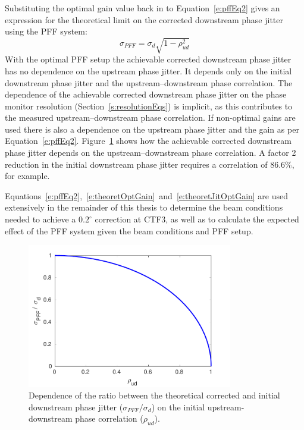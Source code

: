 Substituting the optimal gain value back in to Equation~\ref{e:pffEq2} gives an expression for the theoretical limit on the corrected downstream phase jitter using the PFF system:
\begin{equation}
\sigma_{PFF} = \sigma_d\sqrt{1-\rho_{ud}^2}
\label{e:theoretJitOptGain}
\end{equation}
With the optimal PFF setup the achievable corrected downstream phase jitter has no dependence on the upstream phase jitter. It depends only on the initial downstream phase jitter and the upstream--downstream phase correlation. The dependence of the achievable corrected downstream phase jitter on the phase monitor resolution (Section~\ref{s:resolutionEqs}) is implicit, as this contributes to the measured upstream--downstream phase correlation. If non-optimal gains are used there is also a dependence on the upstream phase jitter and the gain as per Equation~\ref{e:pffEq2}. Figure~\ref{f:theoretJitvsCorr} shows how the achievable corrected downstream phase jitter depends on the upstream--downstream phase correlation. A factor 2 reduction in the initial downstream phase jitter requires a correlation of 86.6\%, for example.

Equations~\ref{e:pffEq2},~\ref{e:theoretOptGain}~and~\ref{e:theoretJitOptGain} are used extensively in the remainder of this thesis to determine the beam conditions needed to achieve a \(0.2^\circ\) correction at CTF3, as well as to calculate the expected effect of the PFF system given the beam conditions and PFF setup.

\begin{figure}
  \centering
  \includegraphics[width=0.8\textwidth]{Figures/propagation/theoretJitvsCorr}
  \caption{Dependence of the ratio between the theoretical corrected and initial downstream phase jitter (\(\sigma_{PFF}/\sigma_d\)) on the initial upstream-downstream phase correlation (\(\rho_{ud}\)).}
  \label{f:theoretJitvsCorr}
\end{figure}

